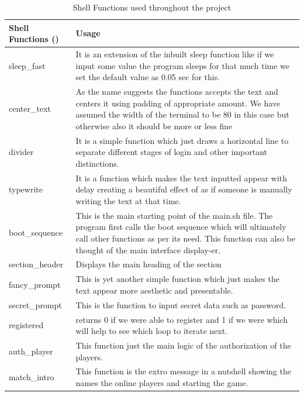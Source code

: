 \documentclass{article}
\begin{document}
\begin{table}[H]
\centering
\begin{tabular}{|p{4cm}|p{9cm}|}
\hline
\textbf{Shell Functions ()} & \textbf{Usage} \\ 
\hline

sleep\_fast
&
It is an extension of the inbuilt sleep function like if we input some value the program sleeps for that much time we set the default value as 0.05 sec for this.\\

\hline
center\_text

 & As the name suggests the functions accepts the text and centers it using padding of appropriate amount. We have assumed the width of the terminal to be 80 in this case but otherwise also it should be more or less fine  \\
 \hline
 divider

 & It is a simple function which just draws a horizontal line to separate different stages of login and other important distinctions. \\
 \hline
typewrite

 & It is a function which makes the text inputted appear with delay creating a beautiful effect of as if someone is manually writing the text at that time. \\
 \hline
 boot\_sequence

 &  This is the main starting point of the main.sh file. The program first calls the boot sequence which will ultimately call other functions as per its need. This function can also be thought of the main interface display-er. \\
 \hline
section\_header

 & Displays the main heading of the section\\
 \hline
 fancy\_prompt
  & This is yet another simple function which just makes the text appear more aesthetic and presentable. \\
 \hline

secret\_prompt
  &This is the function to input secret data such as password.\\
 \hline

 registered
  & returns 0 if we were able to register and 1 if we were which will help to see which loop to iterate next.\\
 \hline

 auth\_player 
  & This function just the main logic of the authorization of the players. \\
 \hline
 match\_intro
  & This function is the extro message in a nutshell showing the names the online players and starting the game.\\
 \hline
\end{tabular}
\caption{Shell Functions used throughout the project}
\end{table}
\newpage
\end{document}
